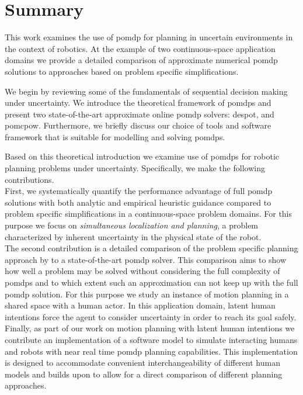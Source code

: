 \chapter{Summary}\label{chap:summary}

This work examines the use of \acf{pomdp} for planning in uncertain
environments in the context of robotics. At the example of two continuous-space
application domains we provide a detailed comparison of approximate numerical
\ac{pomdp} solutions to approaches based on problem specific simplifications.

We begin by reviewing some of the fundamentals of sequential decision making
under uncertainty. We introduce the theoretical framework of \acp{pomdp} and
present two state-of-the-art approximate online \ac{pomdp} solvers:
\acf{despot}, and \acf{pomcpow}. Furthermore, we briefly discuss our choice of
tools and software framework that is suitable for modelling and solving
\acp{pomdp}.

Based on this theoretical introduction we examine use of \acp{pomdp} for
robotic planning problems under uncertainty. Specifically, we make the
following contributions.\\
First, we systematically quantify the performance
advantage of full \ac{pomdp} solutions with both analytic and empirical
heuristic guidance compared to problem specific simplifications in a
continuous-space problem domains. For this purpose we focus on
\emph{simultaneous localization and planning}, a problem characterized by
inherent uncertainty in the physical state of the robot.\\
The second contribution is a detailed comparison of the problem specific
planning approach by \cite{fisac2018probabilistically} to a state-of-the-art
\ac{pomdp} solver. This comparison aims to show how well a problem may be
solved without considering the full complexity of \acp{pomdp} and to which
extent such an approximation can not keep up with the full \ac{pomdp} solution.
For this purpose we study an instance of motion planning in a shared space with
a human actor. In this application domain, latent human intentions force the
agent to consider uncertainty in order to reach its goal safely.\\
Finally, as part of our work on motion planning with latent human intentions
we contribute an implementation of a software model to simulate
interacting humans and robots with near real time \ac{pomdp} planning
capabilities. This implementation is designed to accommodate convenient
interchangeability of different human models and builds upon \pomdpsjl to allow
for a direct comparison of different planning approaches.


